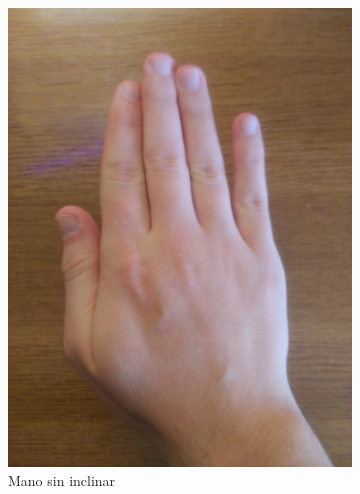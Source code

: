\documentclass[a4paper,11pt]{article}
\begin{document}
\begin{figure}[!h]
	\centering
	\begin{subfigure}{0.32\textwidth}
		\centering
		\includegraphics[scale=0.044]{./Imagenes/normal.jpg}
		\caption{Mano sin inclinar}
	\end{subfigure}
	\begin{subfigure}{0.33\textwidth}
		\centering

\end{subfigure}
\end{figure}
\end{document}

